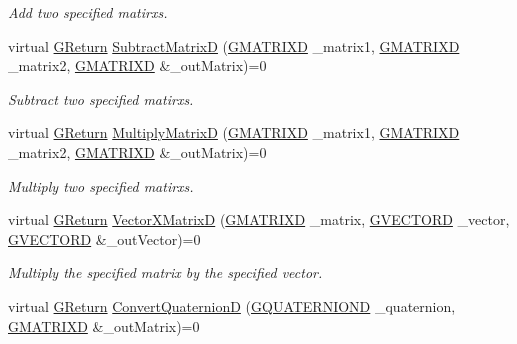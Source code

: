 \begin{DoxyCompactItemize}
\begin{DoxyCompactList}\small\item\em Add two specified matirxs. \end{DoxyCompactList}\item 
virtual \mbox{\hyperlink{namespace_g_w_a67a839e3df7ea8a5c5686613a7a3de21}{G\+Return}} \mbox{\hyperlink{class_g_w_1_1_m_a_t_h_1_1_g_matrix_a64478828c2d51b739dd116d948cb4ac3}{Subtract\+MatrixD}} (\mbox{\hyperlink{struct_g_w_1_1_m_a_t_h_1_1_g_m_a_t_r_i_x_d}{G\+M\+A\+T\+R\+I\+XD}} \+\_\+matrix1, \mbox{\hyperlink{struct_g_w_1_1_m_a_t_h_1_1_g_m_a_t_r_i_x_d}{G\+M\+A\+T\+R\+I\+XD}} \+\_\+matrix2, \mbox{\hyperlink{struct_g_w_1_1_m_a_t_h_1_1_g_m_a_t_r_i_x_d}{G\+M\+A\+T\+R\+I\+XD}} \&\+\_\+out\+Matrix)=0
\begin{DoxyCompactList}\small\item\em Subtract two specified matirxs. \end{DoxyCompactList}\item 
virtual \mbox{\hyperlink{namespace_g_w_a67a839e3df7ea8a5c5686613a7a3de21}{G\+Return}} \mbox{\hyperlink{class_g_w_1_1_m_a_t_h_1_1_g_matrix_a613bcf953961899b45e6d97fc5afc2e1}{Multiply\+MatrixD}} (\mbox{\hyperlink{struct_g_w_1_1_m_a_t_h_1_1_g_m_a_t_r_i_x_d}{G\+M\+A\+T\+R\+I\+XD}} \+\_\+matrix1, \mbox{\hyperlink{struct_g_w_1_1_m_a_t_h_1_1_g_m_a_t_r_i_x_d}{G\+M\+A\+T\+R\+I\+XD}} \+\_\+matrix2, \mbox{\hyperlink{struct_g_w_1_1_m_a_t_h_1_1_g_m_a_t_r_i_x_d}{G\+M\+A\+T\+R\+I\+XD}} \&\+\_\+out\+Matrix)=0
\begin{DoxyCompactList}\small\item\em Multiply two specified matirxs. \end{DoxyCompactList}\item 
virtual \mbox{\hyperlink{namespace_g_w_a67a839e3df7ea8a5c5686613a7a3de21}{G\+Return}} \mbox{\hyperlink{class_g_w_1_1_m_a_t_h_1_1_g_matrix_a97cb7b6353e8f89405e44b09390a67cb}{Vector\+X\+MatrixD}} (\mbox{\hyperlink{struct_g_w_1_1_m_a_t_h_1_1_g_m_a_t_r_i_x_d}{G\+M\+A\+T\+R\+I\+XD}} \+\_\+matrix, \mbox{\hyperlink{struct_g_w_1_1_m_a_t_h_1_1_g_v_e_c_t_o_r_d}{G\+V\+E\+C\+T\+O\+RD}} \+\_\+vector, \mbox{\hyperlink{struct_g_w_1_1_m_a_t_h_1_1_g_v_e_c_t_o_r_d}{G\+V\+E\+C\+T\+O\+RD}} \&\+\_\+out\+Vector)=0
\begin{DoxyCompactList}\small\item\em Multiply the specified matrix by the specified vector. \end{DoxyCompactList}\item 
virtual \mbox{\hyperlink{namespace_g_w_a67a839e3df7ea8a5c5686613a7a3de21}{G\+Return}} \mbox{\hyperlink{class_g_w_1_1_m_a_t_h_1_1_g_matrix_a602c82afc9b9f55c10d6a61da54dcb6c}{Convert\+QuaternionD}} (\mbox{\hyperlink{struct_g_w_1_1_m_a_t_h_1_1_g_q_u_a_t_e_r_n_i_o_n_d}{G\+Q\+U\+A\+T\+E\+R\+N\+I\+O\+ND}} \+\_\+quaternion, \mbox{\hyperlink{struct_g_w_1_1_m_a_t_h_1_1_g_m_a_t_r_i_x_d}{G\+M\+A\+T\+R\+I\+XD}} \&\+\_\+out\+Matrix)=0

\end{DoxyCompactItemize}
